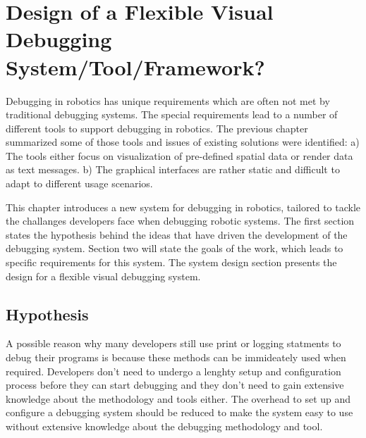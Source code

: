 \chapter{Design of a Flexible Visual Debugging System/Tool/Framework?}
\label{visual_debugging_system}

Debugging in robotics has unique requirements which are often not met by traditional debugging systems. The special requirements lead to a number of different tools to support debugging in robotics. The previous chapter summarized some of those tools and issues of existing solutions were identified: a) The tools either focus on visualization of pre-defined spatial data or render data as text messages. b) The graphical interfaces are rather static and difficult to adapt to different usage scenarios.

This chapter introduces a new system for debugging in robotics, tailored to tackle the challanges developers face when debugging robotic systems. The first section states the hypothesis behind the ideas that have driven the development of the debugging system. Section two will state the goals of the work, which leads to specific requirements for this system. The system design section presents the design for a flexible visual debugging system.




\section{Hypothesis}
A possible reason why many developers still use print or logging statments to debug their programs is because these methods can be immideately used when required. Developers don't need to undergo a lenghty setup and configuration process before they can start debugging and they don't need to gain extensive knowledge about the methodology and tools either. The overhead to set up and configure a debugging system should be reduced to make the system easy to use without extensive knowledge about the debugging methodology and tool.

